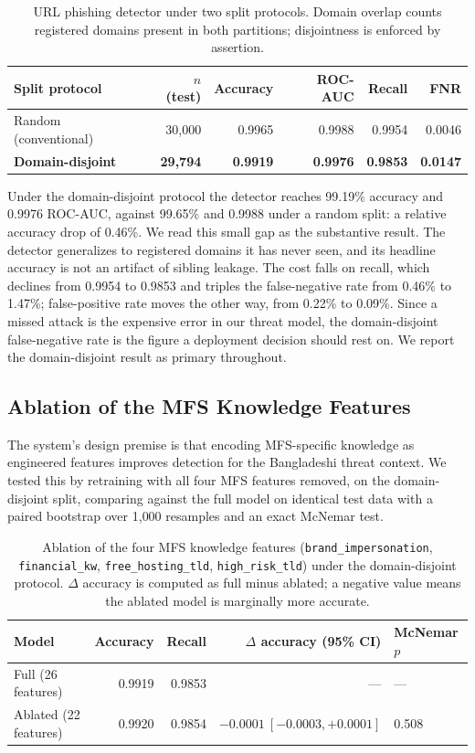 \documentclass[preprint,12pt,number]{elsarticle}
\begin{document}
\begin{table}[t]
\centering
\caption{URL phishing detector under two split protocols. Domain overlap counts registered domains present in both partitions; disjointness is enforced by assertion.}
\label{tab:splits}
\small
\begin{tabular}{lrrrrr}
\toprule
Split protocol & $n$ (test) & Accuracy & ROC-AUC & Recall & FNR \\
\midrule
Random (conventional) & 30{,}000 & 0.9965 & 0.9988 & 0.9954 & 0.0046 \\
\textbf{Domain-disjoint} & \textbf{29{,}794} & \textbf{0.9919} & \textbf{0.9976} & \textbf{0.9853} & \textbf{0.0147} \\
\bottomrule
\end{tabular}
\end{table}

Under the domain-disjoint protocol the detector reaches 99.19\% accuracy and 0.9976 ROC-AUC, against 99.65\% and 0.9988 under a random split: a relative accuracy drop of 0.46\%. We read this small gap as the substantive result. The detector generalizes to registered domains it has never seen, and its headline accuracy is not an artifact of sibling leakage. The cost falls on recall, which declines from 0.9954 to 0.9853 and triples the false-negative rate from 0.46\% to 1.47\%; false-positive rate moves the other way, from 0.22\% to 0.09\%. Since a missed attack is the expensive error in our threat model, the domain-disjoint false-negative rate is the figure a deployment decision should rest on. We report the domain-disjoint result as primary throughout.

\subsection{Ablation of the MFS Knowledge Features}
The system's design premise is that encoding MFS-specific knowledge as engineered features improves detection for the Bangladeshi threat context. We tested this by retraining with all four MFS features removed, on the domain-disjoint split, comparing against the full model on identical test data with a paired bootstrap over 1{,}000 resamples and an exact McNemar test.

\begin{table}[t]
\centering
\caption{Ablation of the four MFS knowledge features (\texttt{brand\_impersonation}, \texttt{financial\_kw}, \texttt{free\_hosting\_tld}, \texttt{high\_risk\_tld}) under the domain-disjoint protocol. $\Delta$ accuracy is computed as full minus ablated; a negative value means the ablated model is marginally more accurate.}
\label{tab:ablation}
\small
\begin{tabular}{lrrrl}
\toprule
Model & Accuracy & Recall & $\Delta$ accuracy (95\% CI) & McNemar $p$ \\
\midrule
Full (26 features) & 0.9919 & 0.9853 & --- & --- \\
Ablated (22 features) & 0.9920 & 0.9854 & $-0.0001\ [-0.0003, +0.0001]$ & 0.508 \\
\bottomrule
\end{tabular}
\end{table}
\end{document}
